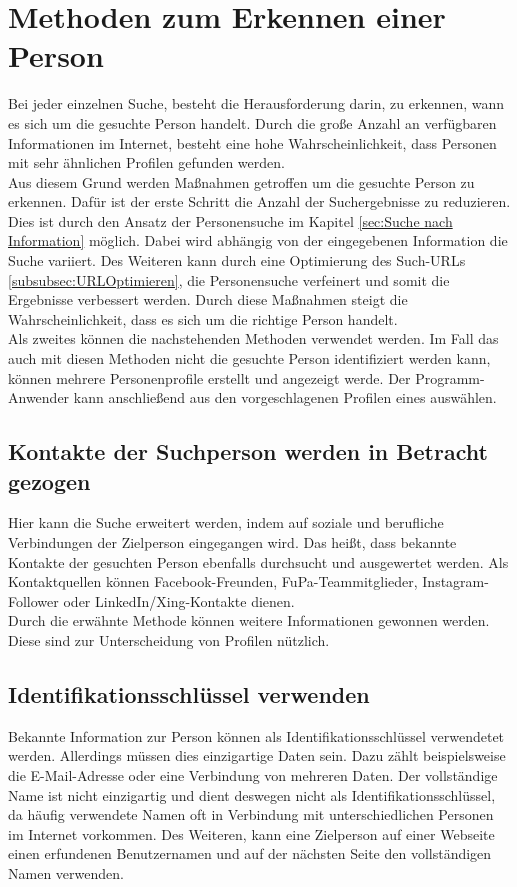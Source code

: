 \section{Methoden zum Erkennen einer Person}
\label{sec:WannhandeltessichumdiegesuchtePerson}
Bei jeder einzelnen Suche, besteht die Herausforderung darin, zu erkennen, wann es sich um die gesuchte Person handelt. Durch die große Anzahl an verfügbaren Informationen im Internet, besteht eine hohe Wahrscheinlichkeit, dass Personen mit sehr ähnlichen Profilen gefunden werden.\\
Aus diesem Grund werden Maßnahmen getroffen um die gesuchte Person zu erkennen. Dafür ist der erste Schritt die Anzahl der Suchergebnisse zu reduzieren. Dies ist durch den Ansatz der Personensuche im Kapitel \ref{sec:Suche nach Information} möglich. Dabei wird abhängig von der eingegebenen Information die Suche variiert. Des Weiteren kann durch eine Optimierung des Such-URLs \ref{subsubsec:URLOptimieren}, die Personensuche verfeinert und somit die Ergebnisse verbessert werden. Durch diese Maßnahmen steigt die Wahrscheinlichkeit, dass es sich um die richtige Person handelt.\\
Als zweites können die nachstehenden Methoden verwendet werden. Im Fall das auch mit diesen Methoden nicht die gesuchte Person identifiziert werden kann, können mehrere Personenprofile erstellt und angezeigt werde. Der Programm-Anwender kann anschließend aus den vorgeschlagenen Profilen eines auswählen.

	\subsection{Kontakte der Suchperson werden in Betracht gezogen}	
	Hier kann die Suche erweitert werden, indem auf soziale und berufliche Verbindungen der Zielperson eingegangen wird. Das heißt, dass bekannte Kontakte der gesuchten Person ebenfalls durchsucht und ausgewertet werden. Als Kontaktquellen können Facebook-Freunden, FuPa-Teammitglieder, Instagram-Follower oder LinkedIn/Xing-Kontakte dienen.\\
	Durch die erwähnte Methode können weitere Informationen gewonnen werden. Diese sind zur Unterscheidung von Profilen nützlich.
	
	\subsection{Identifikationsschlüssel verwenden}
	Bekannte Information zur Person können als Identifikationsschlüssel verwendetet werden. Allerdings müssen dies einzigartige Daten sein. Dazu zählt beispielsweise die E-Mail-Adresse oder eine Verbindung von mehreren Daten. Der vollständige Name ist nicht einzigartig und dient deswegen nicht als Identifikationsschlüssel, da häufig verwendete Namen oft in Verbindung mit unterschiedlichen Personen im Internet vorkommen. Des Weiteren, kann eine Zielperson auf einer Webseite einen erfundenen Benutzernamen und auf der nächsten Seite den vollständigen Namen verwenden.\\
	
